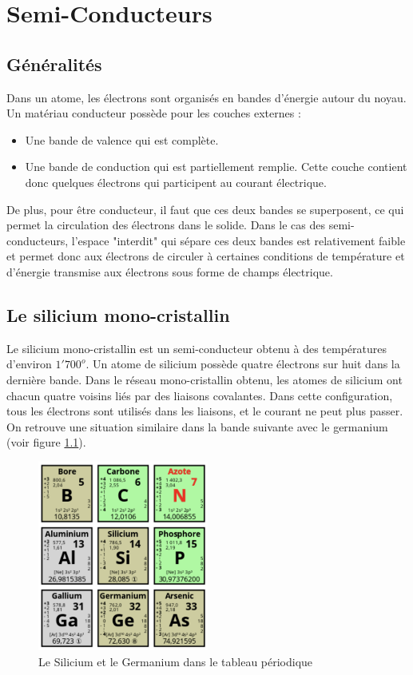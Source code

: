 \documentclass[a4paper,11pt]{book}
\theoremstyle{definition}
\begin{document}
\chapter{Semi-Conducteurs}
\section{Généralités}
Dans un atome, les électrons sont organisés en bandes d'énergie autour du noyau. Un matériau conducteur possède pour les couches externes :
\begin{itemize}
    \item Une bande de valence qui est complète.
    \item Une bande de conduction qui est partiellement remplie. Cette couche contient donc quelques électrons qui participent au courant électrique.
\end{itemize}
De plus, pour être conducteur, il faut que ces deux bandes se superposent, ce qui permet la circulation des électrons dans le solide.
Dans le cas des semi-conducteurs, l'espace "interdit" qui sépare ces deux bandes est relativement faible et permet donc aux électrons de circuler à certaines conditions de température et d'énergie transmise aux électrons sous forme de champs électrique.

\section{Le silicium mono-cristallin}
Le silicium mono-cristallin est un semi-conducteur obtenu à des températures d'environ $1'700^o$. Un atome de silicium possède quatre électrons sur huit dans la dernière bande. Dans le réseau mono-cristallin  obtenu, les atomes de silicium ont chacun quatre voisins liés par des liaisons covalantes. Dans cette configuration, tous les électrons sont utilisés dans les liaisons, et le courant ne peut plus passer. On retrouve une situation similaire dans la bande suivante avec le germanium (voir figure \ref{fig:period}). 

\begin{figure}[h]
\centering
\includegraphics[width=0.5\textwidth]{media/Semicon/TabPerioSI.png}
\caption{Le Silicium et le Germanium dans le tableau périodique}
\label{fig:period}
\end{figure}
\end{document}
